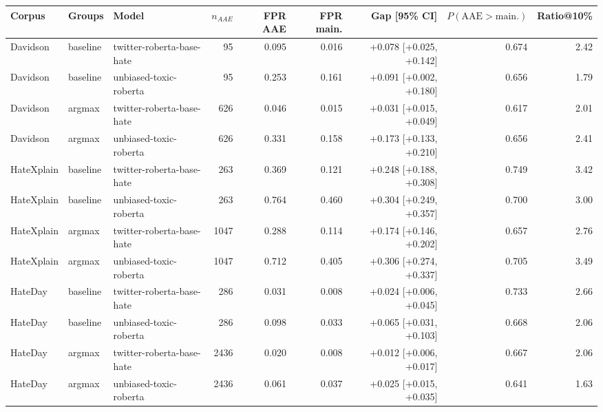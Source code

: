 \begin{tabular}{lllrrrrrr}
\hline
Corpus & Groups & Model & $n_{AAE}$ & FPR AAE & FPR main. & Gap [95\% CI] & $P(\mathrm{AAE}>\mathrm{main.})$ & Ratio@10\% \\
\hline
Davidson & baseline & twitter-roberta-base-hate & 95 & 0.095 & 0.016 & +0.078 [+0.025, +0.142] & 0.674 & 2.42 \\
Davidson & baseline & unbiased-toxic-roberta & 95 & 0.253 & 0.161 & +0.091 [+0.002, +0.180] & 0.656 & 1.79 \\
Davidson & argmax & twitter-roberta-base-hate & 626 & 0.046 & 0.015 & +0.031 [+0.015, +0.049] & 0.617 & 2.01 \\
Davidson & argmax & unbiased-toxic-roberta & 626 & 0.331 & 0.158 & +0.173 [+0.133, +0.210] & 0.656 & 2.41 \\
HateXplain & baseline & twitter-roberta-base-hate & 263 & 0.369 & 0.121 & +0.248 [+0.188, +0.308] & 0.749 & 3.42 \\
HateXplain & baseline & unbiased-toxic-roberta & 263 & 0.764 & 0.460 & +0.304 [+0.249, +0.357] & 0.700 & 3.00 \\
HateXplain & argmax & twitter-roberta-base-hate & 1047 & 0.288 & 0.114 & +0.174 [+0.146, +0.202] & 0.657 & 2.76 \\
HateXplain & argmax & unbiased-toxic-roberta & 1047 & 0.712 & 0.405 & +0.306 [+0.274, +0.337] & 0.705 & 3.49 \\
HateDay & baseline & twitter-roberta-base-hate & 286 & 0.031 & 0.008 & +0.024 [+0.006, +0.045] & 0.733 & 2.66 \\
HateDay & baseline & unbiased-toxic-roberta & 286 & 0.098 & 0.033 & +0.065 [+0.031, +0.103] & 0.668 & 2.06 \\
HateDay & argmax & twitter-roberta-base-hate & 2436 & 0.020 & 0.008 & +0.012 [+0.006, +0.017] & 0.667 & 2.06 \\
HateDay & argmax & unbiased-toxic-roberta & 2436 & 0.061 & 0.037 & +0.025 [+0.015, +0.035] & 0.641 & 1.63 \\
\hline
\end{tabular}

